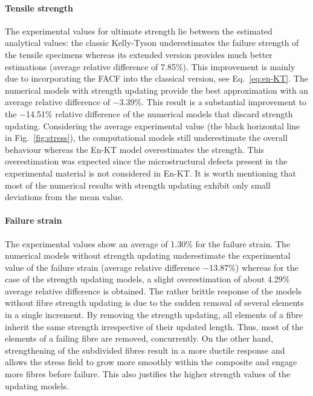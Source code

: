 	\paragraph{Tensile strength} The experimental values for ultimate strength lie between the estimated analytical values: the classic Kelly-Tyson underestimates the failure strength of the tensile specimens whereas its extended version provides much better estimations (average relative difference of 7.85\%). This improvement is mainly due to incorporating the FACF into the classical version, see Eq.~\eqref{eq:en-KT}. The numerical models with strength updating provide the best approximation with an average relative difference of $-$3.39\%. This result is a substantial improvement to the $-$14.51\% relative difference of the numerical models that discard strength updating. Considering the average experimental value (the black horizontal line in Fig.~\ref{fig:stress}), the computational models still underestimate the overall behaviour whereas the En-KT model overestimates the strength. This overestimation was expected since the microstructural defects present in the experimental material is not considered in En-KT. It is worth mentioning that most of the numerical results with strength updating exhibit only small deviations from the mean value.
	

	\paragraph{Failure strain} The experimental values show an average of 1.30\% for the failure strain. The numerical models without strength updating underestimate the experimental value of the failure strain (average relative difference $-$13.87\%) whereas for the case of the strength updating models, a slight overestimation of about 4.29\% average relative difference is obtained. The rather brittle response of the models without fibre strength updating is due to the sudden removal of several elements in a single increment. By removing the strength updating, all elements of a fibre inherit the same strength irrespective of their updated length. Thus, most of the elements of a failing fibre are removed, concurrently. On the other hand, strengthening of the subdivided fibres result in a more ductile response and allows the stress field to grow more smoothly within the composite and engage more fibres before failure. This also justifies the higher strength values of the updating models.
	
